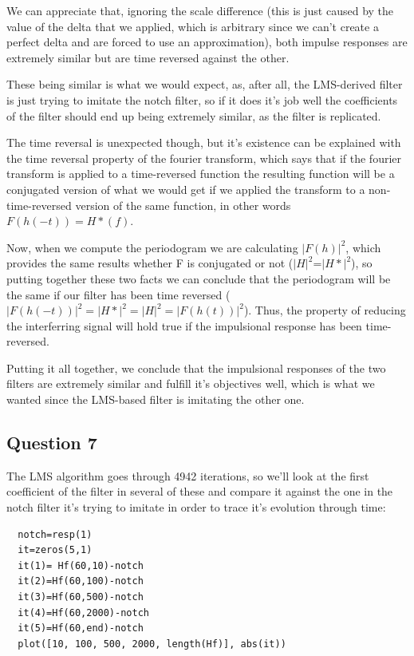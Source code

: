 \documentclass[conference,9pt]{IEEEtran}
\begin{document}
We can appreciate that, ignoring the scale difference (this is just caused by the value of the delta that we applied, which is arbitrary since we can't create a perfect delta and are forced to use an approximation), both impulse responses are extremely similar but are time reversed against the other.

These being similar is what we would expect, as, after all, the LMS-derived filter is just trying to imitate the notch filter, so if it does it's job well the coefficients of the filter should end up being extremely similar, as the filter is replicated.

The time reversal is unexpected though, but it's existence can be explained with the time reversal property of the fourier transform, which says that if the fourier transform is applied to a time-reversed function the resulting function will be a conjugated version of what we would get if we applied the transform to a non-time-reversed version of the same function, in other words $F(h(-t))=H*(f)$.

Now, when we compute the periodogram we are calculating $|F(h)|^2$, which provides the same results whether F is conjugated or not ($|H|^2$=$|H*|^2$), so putting together these two facts we can conclude that the periodogram will be the same if our filter has been time reversed ($|F(h(-t))|^2=|H*|^2=|H|^2=|F(h(t))|^2$). Thus, the property of reducing the interferring signal will hold true if the impulsional response has been time-reversed.

Putting it all together, we conclude that the impulsional responses of the two filters are extremely similar and fulfill it's objectives well, which is what we wanted since the LMS-based filter is imitating the other one.

\subsection{Question 7}
The LMS algorithm goes through 4942 iterations, so we'll look at the first coefficient of the filter in several of these and compare it against the one in the notch filter it's trying to imitate in order to trace it's evolution through time:

\begin{verbatim}
  notch=resp(1)
  it=zeros(5,1)
  it(1)= Hf(60,10)-notch
  it(2)=Hf(60,100)-notch
  it(3)=Hf(60,500)-notch
  it(4)=Hf(60,2000)-notch
  it(5)=Hf(60,end)-notch
  plot([10, 100, 500, 2000, length(Hf)], abs(it))
\end{verbatim}
\end{document}
